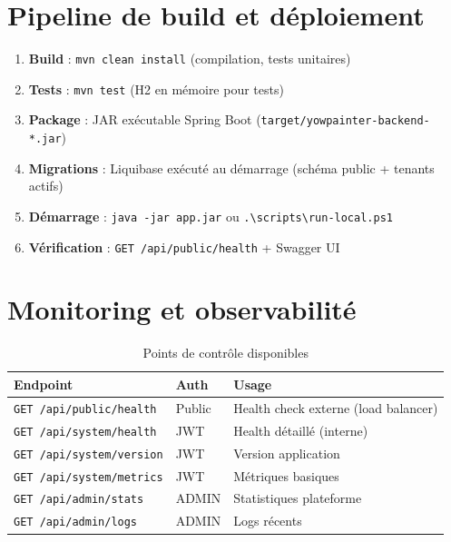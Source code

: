 \section{Pipeline de build et déploiement}

\begin{enumerate}[noitemsep]
  \item \textbf{Build} : \texttt{mvn clean install} (compilation, tests unitaires)
  \item \textbf{Tests} : \texttt{mvn test} (H2 en mémoire pour tests)
  \item \textbf{Package} : JAR exécutable Spring Boot (\texttt{target/yowpainter-backend-*.jar})
  \item \textbf{Migrations} : Liquibase exécuté au démarrage (schéma public + tenants actifs)
  \item \textbf{Démarrage} : \texttt{java -jar app.jar} ou \texttt{.\textbackslash scripts\textbackslash run-local.ps1}
  \item \textbf{Vérification} : \texttt{GET /api/public/health} + Swagger UI
\end{enumerate}

\section{Monitoring et observabilité}

\begin{table}[h]
  \centering
  \caption{Points de contrôle disponibles}
  \label{tab:monitoring}
  \begin{tabular}{@{}lll@{}}
    \toprule
    \textbf{Endpoint} & \textbf{Auth} & \textbf{Usage} \\
    \midrule
    \texttt{GET /api/public/health} & Public & Health check externe (load balancer) \\
    \texttt{GET /api/system/health} & JWT & Health détaillé (interne) \\
    \texttt{GET /api/system/version} & JWT & Version application \\
    \texttt{GET /api/system/metrics} & JWT & Métriques basiques \\
    \texttt{GET /api/admin/stats} & ADMIN & Statistiques plateforme \\
    \texttt{GET /api/admin/logs} & ADMIN & Logs récents \\
    \bottomrule
  \end{tabular}
\end{table}
